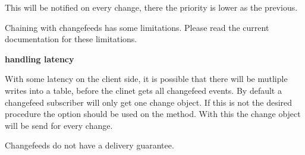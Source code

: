 This will be notified on every change, there the priority is lower as the previous.

Chaining with changefeeds has some limitations.
Please read the current documentation for these limitations.

\textbf{handling latency}

With some latency on the client side, it is possible that there will be mutliple writes into a table, before the clinet gets all changefeed events.
By default a changefeed subscriber will only get one change object.
If this is not the desired procedure the option  should be used on the  method.
With this the change object will be send for every change.

Changefeeds do not have a delivery guarantee.

